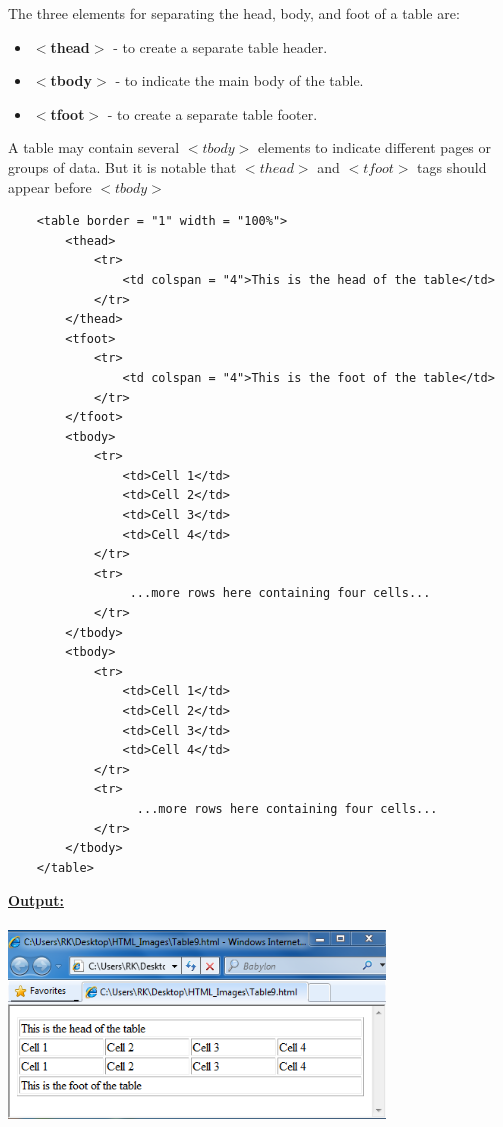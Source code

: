 \documentclass[11pt,a4paper]{article}
\begin{document}
The three elements for separating the head, body, and foot of a table are:
\begin{itemize}
\item \textbf{$<$thead$>$} - to create a separate table header.
\item \textbf{$<$tbody$>$} - to indicate the main body of the table.
\item \textbf{$<$tfoot$>$} - to create a separate table footer.
\end{itemize}
A table may contain several $<tbody>$ elements to indicate different pages or groups of data. But it is notable that $<thead>$ and $<tfoot>$ tags should appear before $<tbody>$
\begin{verbatim}
    <table border = "1" width = "100%">
        <thead>
            <tr>
                <td colspan = "4">This is the head of the table</td>
            </tr>
        </thead>
        <tfoot>
            <tr>
                <td colspan = "4">This is the foot of the table</td>
            </tr>
        </tfoot>
        <tbody>
            <tr>
                <td>Cell 1</td>
                <td>Cell 2</td>
                <td>Cell 3</td>
                <td>Cell 4</td>
            </tr>
            <tr>
                 ...more rows here containing four cells...
            </tr>
        </tbody>
        <tbody>
            <tr>
                <td>Cell 1</td>
                <td>Cell 2</td>
                <td>Cell 3</td>
                <td>Cell 4</td>
            </tr>
            <tr>
                  ...more rows here containing four cells...
            </tr>
        </tbody>
    </table>
\end{verbatim}


\underline{\textbf{Output:}}\\
\includegraphics[height = 60mm, width = 100mm]{Table8.png}
\end{document}
